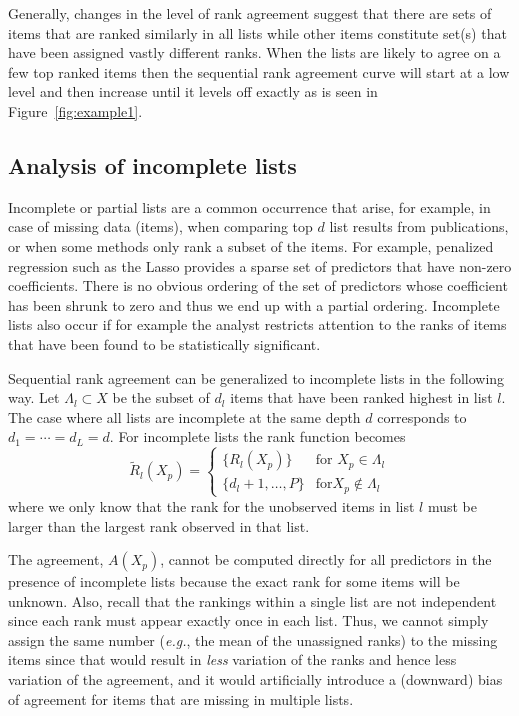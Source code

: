 \documentclass[oupdraft]{bio}
\makeatletter
\newcommand{\eg}{\emph{e.g.}\@\xspace}
\makeatother
\begin{document}


Generally, changes in the level of rank agreement suggest that there
are sets of items that are ranked similarly in all lists while other
items constitute set(s) that have been assigned vastly different
ranks. When the lists are likely to agree on a few top ranked items
then the sequential rank agreement curve will start at a low level and
then increase until it levels off exactly as is seen in
Figure~\ref{fig:example1}.

\subsection{Analysis of incomplete lists}
Incomplete or partial lists are a common occurrence that arise, for
example, in case of missing data (items), when comparing top $d$ list
results from publications, or when some methods only rank a subset of
the items. For example, penalized regression such as the Lasso
provides a sparse set of predictors that have non-zero
coefficients. There is no obvious ordering of the set of predictors
whose coefficient has been shrunk to zero and thus we end up with a
partial ordering.  Incomplete lists also occur if for example the analyst
restricts attention to the ranks of items that have been found to be
statistically significant.

Sequential rank agreement can be generalized to incomplete lists in
the following way. Let $\Lambda_l\subset X$ be the subset of $d_l$
items that have been ranked highest in list $l$.  The case where all
lists are incomplete at the same depth $d$ corresponds to
$d_1=\cdots=d_L=d$. For incomplete lists the rank function becomes
\begin{equation}
	\widetilde R_l(X_p) = \begin{cases}
	     \{R_l(X_p)\} & \text{for } X_p\in \Lambda_l\\
	     \{d_l+1,\dots,P\} & \text{for} X_p \not\in \Lambda_l
        \end{cases}
\end{equation}
where we only know that the rank for the unobserved items in list $l$
must be larger than the largest rank observed in that list.

The agreement, $A(X_p)$, cannot be computed directly for all
predictors in the presence of incomplete lists because the exact rank
for some items will be unknown. Also, recall that the rankings within
a single list are not independent since each rank must appear exactly
once in each list. Thus, we cannot simply assign the same number
(\eg, the mean of the unassigned ranks) to the missing items since
that would result in \emph{less} variation of the ranks and hence less
variation of the agreement, and it would artificially introduce a
(downward) bias of agreement for items that are missing in multiple
lists.
\end{document}
